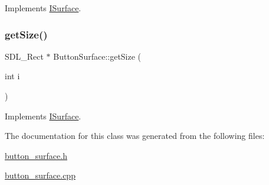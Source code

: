 Implements \mbox{\hyperlink{class_i_surface_a1553f92deac310771e6fe63d62fc1d95}{I\+Surface}}.

\mbox{\label{class_button_surface_a6d9fea1db4128f1cafe1237fd217870d}} 
\subsubsection{\texorpdfstring{get\+Size()}{getSize()}}
{\footnotesize\ttfamily S\+D\+L\+\_\+\+Rect $\ast$ Button\+Surface\+::get\+Size (\begin{DoxyParamCaption}\item[{int}]{i }\end{DoxyParamCaption})\hspace{0.3cm}{\ttfamily [virtual]}}



Implements \mbox{\hyperlink{class_i_surface_ae0b5040cd0eaa1897f61f994f7b2eacf}{I\+Surface}}.



The documentation for this class was generated from the following files\+:\begin{DoxyCompactItemize}
\item 
\mbox{\hyperlink{button__surface_8h}{button\+\_\+surface.\+h}}\item 
\mbox{\hyperlink{button__surface_8cpp}{button\+\_\+surface.\+cpp}}\end{DoxyCompactItemize}
